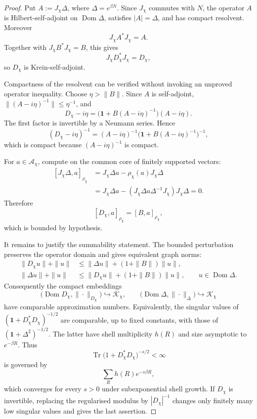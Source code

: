 \documentclass[11pt]{article}
\theoremstyle{definition}
\theoremstyle{remark}
\newcommand{\Kh}{\mathcal{K}}
\newcommand{\one}{\mathbf{1}}
\begin{document}
\begin{proof}
Put \(A:=J_\chi\Delta\), where \(\Delta=e^{\beta N}\).  Since \(J_\chi\)
commutes with \(N\), the operator \(A\) is Hilbert-self-adjoint on
\(\operatorname{Dom}\Delta\), satisfies \(|A|=\Delta\), and has compact
resolvent.  Moreover
\[
  J_\chi A^*J_\chi=A.
\]
Together with \(J_\chi B^*J_\chi=B\), this gives
\[
  J_\chi D_\chi^*J_\chi=D_\chi,
\]
so \(D_\chi\) is Krein-self-adjoint.

Compactness of the resolvent can be verified without invoking an unproved
operator inequality.  Choose \(\eta>\|B\|\).  Since \(A\) is self-adjoint,
\(\|(A-i\eta)^{-1}\|\le\eta^{-1}\), and
\[
  D_\chi-i\eta
  =\bigl(\one+B(A-i\eta)^{-1}\bigr)(A-i\eta).
\]
The first factor is invertible by a Neumann series.  Hence
\[
  (D_\chi-i\eta)^{-1}
  =(A-i\eta)^{-1}
   \bigl(\one+B(A-i\eta)^{-1}\bigr)^{-1},
\]
which is compact because \((A-i\eta)^{-1}\) is compact.

For \(a\in\mathcal A_\chi\), compute on the common core of finitely supported
vectors:
\[
\begin{aligned}
[J_\chi\Delta,a]_{\rho_\chi}
&=J_\chi\Delta a-\rho_\chi(a)J_\chi\Delta  \\
&=J_\chi\Delta a-(J_\chi\Delta a\Delta^{-1}J_\chi)J_\chi\Delta=0 .
\end{aligned}
\]
Therefore
\[
  [D_\chi,a]_{\rho_\chi}=[B,a]_{\rho_\chi},
\]
which is bounded by hypothesis.

It remains to justify the summability statement.  The bounded perturbation
preserves the operator domain and gives equivalent graph norms:
\[
\begin{aligned}
  \|D_\chi u\|+\|u\|
  &\le \|\Delta u\|+(1+\|B\|)\|u\|,\\
  \|\Delta u\|+\|u\|
  &\le \|D_\chi u\|+(1+\|B\|)\|u\|,
  \qquad u\in\operatorname{Dom}\Delta .
\end{aligned}
\]
Consequently the compact embeddings
\[
  \bigl(\operatorname{Dom}D_\chi,\|\cdot\|_{D_\chi}\bigr)
  \hookrightarrow\Kh_\chi,
  \qquad
  \bigl(\operatorname{Dom}\Delta,\|\cdot\|_{\Delta}\bigr)
  \hookrightarrow\Kh_\chi
\]
have comparable approximation numbers.  Equivalently, the singular values of
\((\one+D_\chi^*D_\chi)^{-1/2}\) are comparable, up to fixed constants, with
those of \((\one+\Delta^2)^{-1/2}\).  The latter have shell multiplicity
\(h(R)\) and size asymptotic to \(e^{-\beta R}\).  Thus
\[
  \operatorname{Tr}\bigl(1+D_\chi^*D_\chi\bigr)^{-s/2}
  <\infty
\]
is governed by
\[
  \sum_R h(R)e^{-s\beta R},
\]
which converges for every \(s>0\) under subexponential shell growth.  If
\(D_\chi\) is invertible, replacing the regularised modulus by
\(|D_\chi|^{-1}\) changes only finitely many low singular values and gives the
last assertion.
\end{proof}
\end{document}
